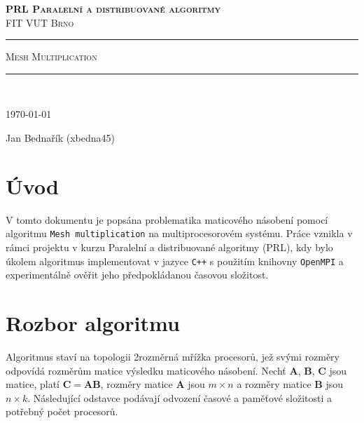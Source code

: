 \documentclass[12pt,a4paper,titlepage,final]{article}
\newcommand{\matr}[1]{\mathbf{#1}}
\begin{document}
\setcounter{page}{1}

    
\begin{centering}
\textsc{\textbf{PRL Paralelní a distribuované algoritmy} \\
FIT VUT Brno\\
}

\rule{\textwidth}{1.6pt}\vspace*{-\baselineskip}\vspace*{25pt} 

\begin{LARGE}
\textsc{Mesh Multiplication}
\end{LARGE}

\rule{\textwidth}{1.6pt}\\ %

\vspace*{5pt} 
\begin{footnotesize}
\today
\end{footnotesize}
\vspace*{5pt} 

\begin{large}
Jan Bednařík (xbedna45)\\
\end{large}

\end{centering}


\section{Úvod}
V tomto dokumentu je popsána problematika maticového násobení pomocí algoritmu \texttt{Mesh multiplication} na multiprocesorovém systému. Práce vznikla v rámci projektu v kurzu Paralelní a distribuované algoritmy (PRL), kdy bylo úkolem algoritmus implementovat v jazyce \texttt{C++} s použitím knihovny \texttt{OpenMPI} a experimentálně ověřit jeho předpokládanou časovou složitost.

\section{Rozbor algoritmu}
Algoritmus staví na topologii 2rozměrná mřížka procesorů, jež svými rozměry odpovídá rozměrům matice výsledku maticového násobení. Nechť $\matr{A}$, $\matr{B}$, $\matr{C}$ jsou matice, platí $\matr{C} = \matr{A}\matr{B}$, rozměry matice $\matr{A}$ jsou $m \times n$ a rozměry matice $\matr{B}$ jsou $n \times k$. Následující odstavce podávají odvození časové a paměťové složitosti a potřebný počet procesorů.
\end{document}
